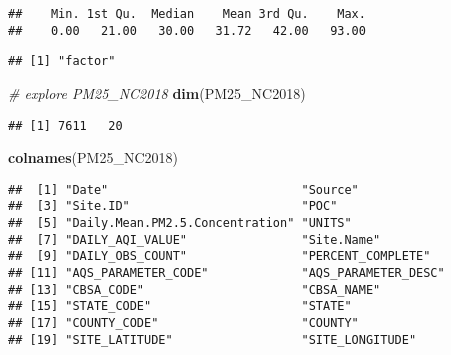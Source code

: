\documentclass[]{article}
\newenvironment{Shaded}{\begin{snugshade}}{\end{snugshade}}
\newcommand{\KeywordTok}[1]{\textcolor[rgb]{0.13,0.29,0.53}{\textbf{#1}}}
\newcommand{\CommentTok}[1]{\textcolor[rgb]{0.56,0.35,0.01}{\textit{#1}}}
\newcommand{\OperatorTok}[1]{\textcolor[rgb]{0.81,0.36,0.00}{\textbf{#1}}}
\newcommand{\NormalTok}[1]{#1}
\begin{document}
\begin{Shaded}
\end{Shaded}

\begin{verbatim}
##    Min. 1st Qu.  Median    Mean 3rd Qu.    Max. 
##    0.00   21.00   30.00   31.72   42.00   93.00
\end{verbatim}

\begin{Shaded}
\end{Shaded}

\begin{verbatim}
## [1] "factor"
\end{verbatim}

\begin{Shaded}
\begin{Highlighting}[]
\CommentTok{# explore PM25_NC2018}
\KeywordTok{dim}\NormalTok{(PM25_NC2018)}
\end{Highlighting}
\end{Shaded}

\begin{verbatim}
## [1] 7611   20
\end{verbatim}

\begin{Shaded}
\begin{Highlighting}[]
\KeywordTok{colnames}\NormalTok{(PM25_NC2018)}
\end{Highlighting}
\end{Shaded}

\begin{verbatim}
##  [1] "Date"                           "Source"                        
##  [3] "Site.ID"                        "POC"                           
##  [5] "Daily.Mean.PM2.5.Concentration" "UNITS"                         
##  [7] "DAILY_AQI_VALUE"                "Site.Name"                     
##  [9] "DAILY_OBS_COUNT"                "PERCENT_COMPLETE"              
## [11] "AQS_PARAMETER_CODE"             "AQS_PARAMETER_DESC"            
## [13] "CBSA_CODE"                      "CBSA_NAME"                     
## [15] "STATE_CODE"                     "STATE"                         
## [17] "COUNTY_CODE"                    "COUNTY"                        
## [19] "SITE_LATITUDE"                  "SITE_LONGITUDE"
\end{verbatim}
\end{document}
